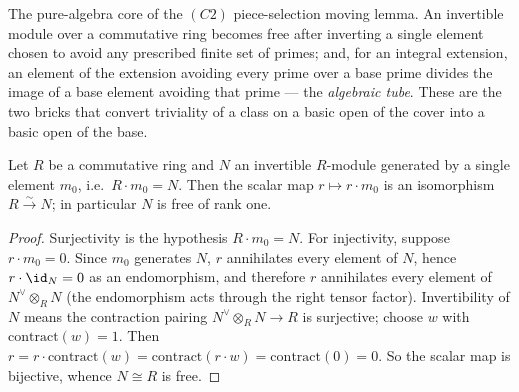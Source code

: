The pure-algebra core of the \((C2)\) piece-selection moving lemma. An invertible module over a
commutative ring becomes free after inverting a single element chosen to avoid any prescribed finite
set of primes; and, for an integral extension, an element of the extension avoiding every prime over
a base prime divides the image of a base element avoiding that prime --- the \emph{algebraic tube}.
These are the two bricks that convert triviality of a class on a basic open of the cover into a
basic open of the base.

\begin{lemma}
  \label{pa-lem:invertible_cyclic_free}
  \leanok

  Let \(R\) be a commutative ring and \(N\) an invertible \(R\)-module generated by a single element
  \(m_0\), i.e.\ \(R \cdot m_0 = N\). Then the scalar map \(r \mapsto r \cdot m_0\) is an isomorphism
  \(R \xrightarrow{\sim} N\); in particular \(N\) is free of rank one.
\end{lemma}
\begin{proof}
  \leanok
  Surjectivity is the hypothesis \(R \cdot m_0 = N\). For injectivity, suppose \(r \cdot m_0 = 0\).
  Since \(m_0\) generates \(N\), \(r\) annihilates every element of \(N\), hence \(r \cdot \id_N = 0\)
  as an endomorphism, and therefore \(r\) annihilates every element of \(N^{\vee} \otimes_R N\) (the
  endomorphism acts through the right tensor factor). Invertibility of \(N\) means the contraction
  pairing \(N^{\vee} \otimes_R N \to R\) is surjective; choose \(w\) with \(\mathrm{contract}(w) = 1\).
  Then \(r = r \cdot \mathrm{contract}(w) = \mathrm{contract}(r \cdot w) = \mathrm{contract}(0) = 0\).
  So the scalar map is bijective, whence \(N \cong R\) is free.
\end{proof}

